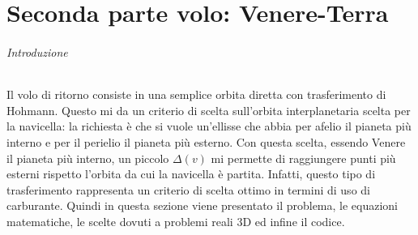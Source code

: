 \documentclass[a4paper]{article}
\begin{document}
\newpage
\part{Seconda parte volo: Venere-Terra}
\paragraph{Introduzione\newline}
Il volo di ritorno consiste in una semplice orbita diretta con trasferimento di Hohmann. Questo mi da un criterio di scelta sull'orbita interplanetaria scelta per la navicella: la richiesta è che si vuole un'ellisse che abbia per afelio il pianeta più interno e per il perielio il pianeta più esterno. Con questa scelta, essendo Venere il pianeta più interno, un piccolo $\Delta(\textit{v})$ mi permette di raggiungere punti più esterni rispetto l'orbita da cui la navicella è partita. Infatti, questo tipo di trasferimento rappresenta un criterio di scelta ottimo in termini di uso di carburante. \newline Quindi in questa sezione viene presentato il problema, le equazioni matematiche, le scelte dovuti a problemi reali 3D ed infine il codice.
\end{document}
